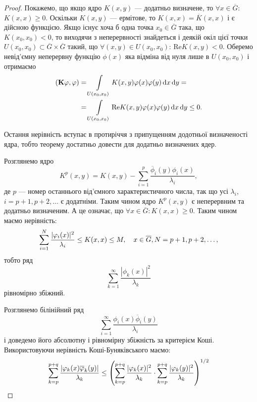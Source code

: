 \begin{proof}
    Покажемо, що якщо ядро $K(x,y)$ --- додатньо визначене, то $\forall x\in\overline G$: $K(x,x)\ge0$. Оскільки $K(x,y)$ --- ермітове, то $K(x,x)=\overline K(x,x)$ і є дійсною функцією. Якщо існує хоча б одна точка $x_0\in\overline G$ така, що $K(x_0,x_0)<0$, то виходячи з неперервності знайдеться і деякій окіл цієї точки $U(x_0,x_0)\subset\overline G\times\overline G$ такий, що $\forall(x,y)\in U(x_0,x_0)$: $\text{Re} K(x,y)<0$. Оберемо невід'ємну неперервну функцію $\phi(x)$ яка відміна від нуля лише в $U(x_0,x_0)$ і отримаємо
    \begin{equation}
        \begin{aligned}
            (\textbf{K}\varphi,\varphi)&=\displaystyle\int\limits_{U(x_0,x_0)}K(x,y)\varphi(x)\varphi(y)\mathop{}\!\mathrm{d} x\mathop{}\!\mathrm{d} y=\\
            &=\displaystyle\int\limits_{U(x_0,x_0)}\text{Re}K(x,y)\varphi(x)\varphi(y)\mathop{}\!\mathrm{d} x\mathop{}\!\mathrm{d} y\le0.
        \end{aligned}
    \end{equation}

    Остання нерівність вступає в протиріччя з припущенням додотньої визначеності ядра, тобто теорему достатньо довести для додатньо визначених ядер. \medskip

    Розглянемо ядро
    \begin{equation}
        K^p(x,y)=K(x,y)-\sum_{i=1}^p\frac{\overline\phi_i(y)\phi_i(x)}{\lambda_i},
    \end{equation}
    де $p$ --- номер останнього від'ємного характеристичного числа, так що усі $\lambda_i$, $i=p+1,p+2,\ldots$ є додатніми. Таким чином ядро $K^p(x,y)$ є неперервним та додатньо визначеним. А це означає, що $\forall x\in\overline G:K(x,x)\ge0$. Таким чином маємо нерівність:
    \begin{equation}
        \displaystyle\sum\limits_{i=1}^N\dfrac{|\varphi_i(x)|^2}{\lambda_i}\le K(x,x)\le M,\quad x\in\overline G, N=p+1,p+2,\ldots,
    \end{equation}
    тобто ряд
    \begin{equation}
        \sum_{k=1}^\infty\frac{|\phi_k(x)|^2}{\lambda_k}
    \end{equation}
    рівномірно збіжний. \medskip

    Розглянемо білінійний ряд 
    \begin{equation}
        \sum_{i=1}^\infty\frac{\phi_i(x)\overline\phi_i(y)}{\lambda_i}
    \end{equation}
    і доведемо його абсолютну і рівномірну збіжність за критерієм Коші. Використовуючи нерівність Коші-Буняківського маємо:
    \begin{equation}
        \displaystyle\sum\limits_{k=p}^{p+q}\dfrac{|\varphi_k(x)\overline{\varphi}_k(y)|}{\lambda_k}\le\left(\displaystyle\sum\limits_{k=p}^{p+q}\dfrac{|\varphi_k(x)|^2}{\lambda_k}\cdot\displaystyle\sum\limits_{k=p}^{p+q}\dfrac{|\varphi_k(y)|^2}{\lambda_k}\right)^{1/2}
    \end{equation}


\end{proof}
